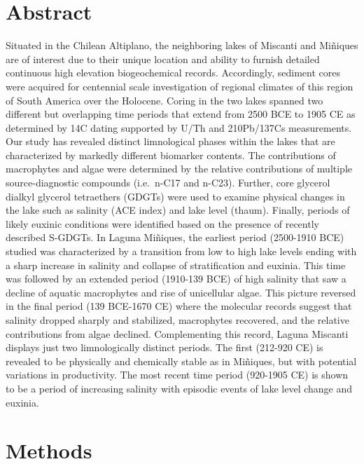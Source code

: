 \documentclass[10pt,letterpaper]{article}
\begin{document}
\section*{Abstract}
Situated in the Chilean Altiplano, the neighboring lakes of Miscanti and
Miñiques are of interest due to their unique location and ability to
furnish detailed continuous high elevation biogeochemical records.
Accordingly, sediment cores were acquired for centennial scale
investigation of regional climates of this region of South America over
the Holocene. Coring in the two lakes spanned two different but
overlapping time periods that extend from 2500 BCE to 1905 CE as
determined by 14C dating supported by U/Th and 210Pb/137Cs measurements.
Our study has revealed distinct limnological phases within the lakes
that are characterized by markedly different biomarker contents. The
contributions of macrophytes and algae were determined by the relative
contributions of multiple source-diagnostic compounds (i.e.~n-C17 and
n-C23). Further, core glycerol dialkyl glycerol tetraethers (GDGTs) were
used to examine physical changes in the lake such as salinity (ACE
index) and lake level (thaum). Finally, periods of likely euxinic
conditions were identified based on the presence of recently described
S-GDGTs. In Laguna Miñiques, the earliest period (2500-1910 BCE) studied
was characterized by a transition from low to high lake levels ending
with a sharp increase in salinity and collapse of stratification and
euxinia. This time was followed by an extended period (1910-139 BCE) of
high salinity that saw a decline of aquatic macrophytes and rise of
unicellular algae. This picture reversed in the final period (139
BCE-1670 CE) where the molecular records suggest that salinity dropped
sharply and stabilized, macrophytes recovered, and the relative
contributions from algae declined. Complementing this record, Laguna
Miscanti displays just two limnologically distinct periods. The first
(212-920 CE) is revealed to be physically and chemically stable as in
Miñiques, but with potential variations in productivity. The most recent
time period (920-1905 CE) is shown to be a period of increasing salinity
with episodic events of lake level change and euxinia.


\linenumbers

\hypertarget{methods}{%
\section{Methods}\label{methods}}
\end{document}
